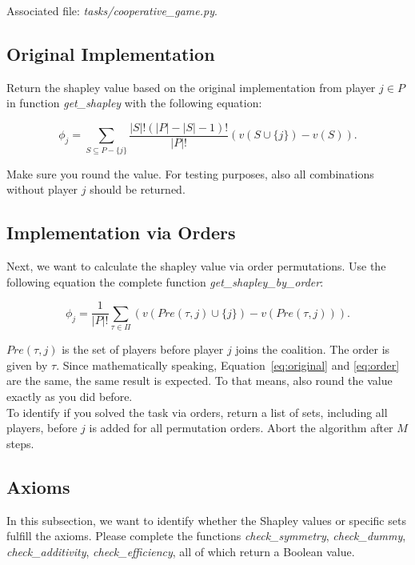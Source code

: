 \documentclass[a4paper]{article}
\begin{document}
\noindent Associated file: \textit{tasks/cooperative\_game.py}.

\subsection{Original Implementation}

Return the shapley value based on the original implementation from player  $j \in P$ in function \textit{get\_shapley} with the following equation:

\begin{equation}
    \phi_j = \sum_{S \subseteq P - \{j\} } \frac{|S|!(|P| - |S| - 1)!}{|P|!}(v(S \cup \{j\}) - v(S)).
    \label{eq:original}
\end{equation}

\noindent Make sure you round the value. For testing purposes, also all combinations without player $j$ should be returned.


\subsection{Implementation via Orders}

Next, we want to calculate the shapley value via order permutations. Use the following equation the complete function \textit{get\_shapley\_by\_order}:

\begin{equation}
    \phi_j = \frac{1}{|P|!} \sum_{\tau \in \Pi} (v(Pre(\tau,j) \cup \{j\}) - v(Pre(\tau,j))).
    \label{eq:order}
\end{equation}

$Pre(\tau,j)$ is the set of players before player $j$ joins the coalition. The order is given by $\tau$. Since mathematically speaking, Equation~\ref{eq:original} and \ref{eq:order} are the same, the same result is expected. To that means, also round the value exactly as you did before.\\

\noindent To identify if you solved the task via orders, return a list of sets, including all players, before $j$ is added for all permutation orders. Abort the algorithm after $M$ steps.


\subsection{Axioms}

In this subsection, we want to identify whether the Shapley values or specific sets fulfill the axioms. Please complete the functions \textit{check\_symmetry}, \textit{check\_dummy}, \textit{check\_additivity}, \textit{check\_efficiency}, all of which return a Boolean value.
\end{document}
